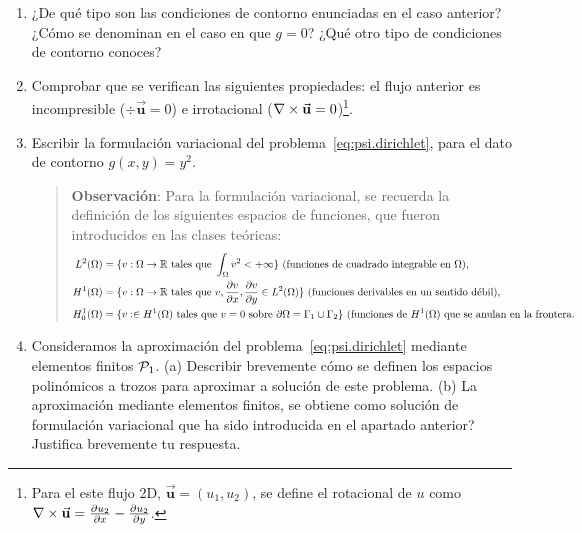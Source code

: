 \documentclass[11pt]{article}
\newcommand{\Vector}[1]{\ensuremath{\vec{\mathbf{#1}}}}
\renewcommand{\uu}{\Vector{u}}
\newcommand{\rot}{\grad\times}
\renewcommand{\dx}[1]{\frac{\partial #1}{\partial x}}
\renewcommand{\dy}[1]{\frac{\partial #1}{\partial y}}
\begin{document}
\begin{enumerate}

\item ¿De qué tipo son las condiciones de contorno enunciadas en el
  caso anterior? ¿Cómo se denominan en el caso en que $g=0$? ¿Qué otro
  tipo de condiciones de contorno conoces?
\item Comprobar que se verifican las siguientes propiedades: el flujo anterior es
  incompresible ($\div\uu=0$) e irrotacional
  ($\rot\uu=0$)\footnote{Para el este flujo 2D, $\uu=(u_1,u_2)$, se
    define el rotacional de $u$ como
    $\rot\uu=\frac{\partial u_2}{\partial x} - \frac{\partial
      u_2}{\partial y}$.}.


\item Escribir la formulación variacional del
  problema~\eqref{eq:psi.dirichlet}, para el dato de contorno
  $g(x,y)=y^2$.
  \begin{quotation}
  \begin{footnotesize}
  \begin{emph}
    \textbf{Observación}: Para la formulación variacional, se recuerda la definición de los siguientes
    espacios de funciones, que fueron introducidos en las clases
    teóricas:
  \begin{align*}
    L^2(\Omega)&=\{ v:\Omega\to\Rset\ \text{tales que}\ \int_\Omega v^2 < +\infty\}
                 \ \text{(funciones de cuadrado integrable en $\Omega$)},
    \\
    H^1(\Omega)&=\{ v:\Omega\to\Rset\ \text{tales que}\ v, \dx{v}, \dy v \in L^2(\Omega) \}
                  \ \text{(funciones derivables en un sentido débil)},
    \\
    H^1_0(\Omega)&=\{ v:\in H^1(\Omega) \ \text{tales que}\ v=0 \text { sobre } \partial\Omega=\Gamma_1\cup\Gamma_2\}
                   \ \text{(funciones de $H^1(\Omega)$ que se anulan en la frontera}.
  \end{align*}
\end{emph}
\end{footnotesize}
\end{quotation}
\vspace{-2em}
\item Consideramos la aproximación del
  problema~\eqref{eq:psi.dirichlet} mediante elementos finitos
  ${\cal P}_1$. (a) Describir brevemente cómo se definen los espacios
  polinómicos a trozos para aproximar a solución de este problema.
  (b) La aproximación mediante elementos finitos, se obtiene como
  solución de formulación variacional que ha sido introducida en el
  apartado anterior? Justifica brevemente tu respuesta.



\end{enumerate}
\end{document}
